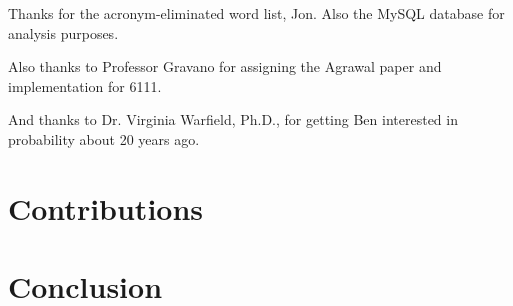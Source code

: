 \documentclass[11pt]{article}
\begin{document}
Thanks for the acronym-eliminated word list, Jon.  Also the MySQL database for analysis purposes.

Also thanks to Professor Gravano for assigning the Agrawal paper and implementation for 6111.

And thanks to Dr. Virginia Warfield, Ph.D., for getting Ben interested in probability about 20 years ago.

\section{Contributions}



\section{Conclusion}
\end{document}
